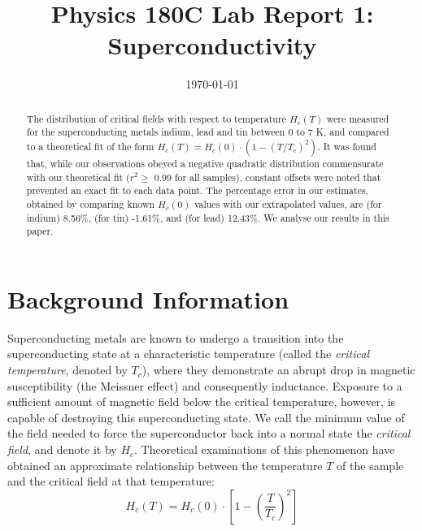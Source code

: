 \documentclass[aps,prl,nofootinbib,twocolumn,superscriptaddress,groupedaddress]{revtex4}  %
\begin{document}
\title{Physics 180C Lab Report 1: Superconductivity}
\date{\today}

\begin{abstract}
The distribution of critical fields with respect to temperature $H_{c}(T)$ were measured for the superconducting metals indium, lead and tin between 0 to 7 K, and compared to a theoretical fit of the form $H_{c}(T) = H_{c}(0)\cdot(1 - (T/T_{c})^{2})$. It was found that, while our observations obeyed a negative quadratic distribution commensurate with our theoretical fit ($r^{2} \geq$ 0.99 for all samples), constant offsets were noted that prevented an exact fit to each data point. The percentage error in our estimates, obtained by comparing known $H_{c}(0)$ values with our extrapolated values, are (for indium) 8.56\%, (for tin) -1.61\%, and (for lead) 12.43\%. We analyse our results in this paper. 
\end{abstract}

\maketitle

\section{Background Information}

Superconducting metals are known to undergo a transition into the superconducting state at a characteristic temperature (called the \textsl{critical temperature}, denoted by $T_{c}$), where they demonstrate an abrupt drop in magnetic susceptibility (the Meissner effect) and consequently inductance. Exposure to a sufficient amount of magnetic field below the critical temperature, however, is capable of destroying this superconducting state. We call the minimum value of the field needed to force the superconductor back into a normal state the \textsl{critical field}, and denote it by $H_{c}$. Theoretical examinations of this phenomenon have obtained an approximate relationship between the temperature $T$ of the sample and the critical field at that temperature\cite{kittel}:
\begin{equation}
H_{c}(T) = H_{c}(0) \cdot \left[ 1 - \left(\frac{T}{T_{c}}\right)^{2}\right]
\end{equation}
 
\end{document}
